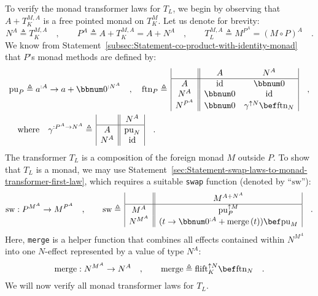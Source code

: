 To verify the monad transformer laws for $T_{L}$, we begin by observing
that $A+T_{K}^{M,A}$ is a free pointed monad on $T_{K}^{M}$. Let
us denote for brevity:
\[
N^{A}\triangleq T_{K}^{M,A}\quad,\quad\quad P^{A}\triangleq A+T_{K}^{M,A}=A+N^{A}\quad,\quad\quad T_{L}^{M,A}\triangleq M^{P^{A}}=\left(M\circ P\right)^{A}\quad.
\]
We know from Statement~\ref{subsec:Statement-co-product-with-identity-monad}
that $P$\textsf{'}s monad methods are defined by:
\begin{align*}
 & \text{pu}_{P}\triangleq a^{:A}\rightarrow a+\bbnum 0^{:N^{A}}\quad,\quad\text{ftn}_{P}\triangleq\,\begin{array}{|c||cc|}
 & A & N^{A}\\
\hline A & \text{id} & \bbnum 0\\
N^{A} & \bbnum 0 & \text{id}\\
N^{P^{A}} & \bbnum 0 & \gamma^{\uparrow N}\bef\text{ftn}_{N}
\end{array}\quad,\\
 & \quad\text{where}\quad\gamma^{:P^{A}\rightarrow N^{A}}\triangleq\,\begin{array}{|c||c|}
 & N^{A}\\
\hline A & \text{pu}_{N}\\
N^{A} & \text{id}
\end{array}\quad.
\end{align*}
The transformer $T_{L}$ is a composition of the foreign monad $M$
outside $P$. To show that $T_{L}$ is a monad, we may use Statement~\ref{sec:Statement-swap-laws-to-monad-transformer-first-law},
which requires a suitable \lstinline!swap! function (denoted by \textsf{``}$\text{sw}$\textsf{''}):
\begin{equation}
\text{sw}:P^{M^{A}}\rightarrow M^{P^{A}}\quad,\quad\quad\text{sw}\triangleq\,\begin{array}{|c||c|}
 & M^{A+N^{A}}\\
\hline M^{A} & \text{pu}_{P}^{\uparrow M}\\
N^{M^{A}} & (t\rightarrow\bbnum 0^{:A}+\text{merge}\,(t))\bef\text{pu}_{M}
\end{array}\quad.\label{eq:def-of-swap-for-free-pointed-monad-transformer}
\end{equation}
Here, \lstinline!merge! is a helper function that combines all effects
contained within $N^{M^{A}}$ into one $N$-effect represented by
a value of type $N^{A}$:
\[
\text{merge}:N^{M^{A}}\rightarrow N^{A}\quad,\quad\quad\text{merge}\triangleq\text{flift}_{K}^{\uparrow N}\bef\text{ftn}_{N}\quad.
\]
We will now verify all monad transformer laws for $T_{L}.$

